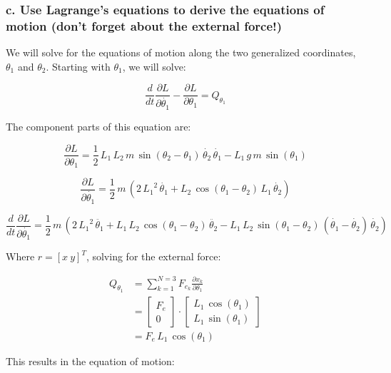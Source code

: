 \documentclass[12pt, letterpaper]{../assignment}
\begin{document}
\subsubsection*{c. Use Lagrange's equations to derive the equations of motion (don't forget about the external
force!)}

We will solve for the equations of motion along the two generalized coordinates, $\theta_1$ and $\theta_2$.
Starting with $\theta_1$, we will solve:

$$ \frac{d}{d t} \frac{\partial L}{\partial \dot{\theta_1}} - \frac{\partial L}{\partial \theta_1} = Q_{\theta_1} $$

The component parts of this equation are:

$$ \frac{\partial L}{\partial \theta_1} = 
\frac{1}{2}\,L_1 \,L_2 \,m\,\sin \left(\theta_2 -\theta_1 \right)\,\dot{\theta_2} \,\dot{\theta_1} -L_1 \,g\,m\,\sin \left(\theta_1 \right) $$

$$ \frac{\partial L}{\partial \dot{\theta_1}}  =
\frac{1}{2}\,m\,{\left(2\,{L_1 }^2 \,\dot{\theta_1} +L_2 \,\cos \left(\theta_1 -\theta_2 \right)\,L_1 \,\dot{\theta_2} \right)} $$

$$ \frac{d}{d t} \frac{\partial L}{\partial \dot{\theta_1}} =
\frac{1}{2}\,m\,{\left(2\,{L_1 }^2 \,\ddot{\theta_1} +L_1 \,L_2 \,\cos \left(\theta_1 -\theta_2 \right)\,\ddot{\theta_2} -L_1 \,L_2 \,\sin \left(\theta_1 -\theta_2 \right)\,{\left(\dot{\theta_1} -\dot{\theta_2} \right)}\,\dot{\theta_2} \right)} $$

Where $r = [ x \ y]^T$, solving for the external force:

\begin{equation*}
    \begin{aligned}
    Q_{\theta_1} &= \sum_{k=1}^{N=3} F_{e_k} \frac{\partial x_k }{\partial {\theta_1}}\\
    &=\left[\begin{array}{c} F_{e}\\ 0 \end{array}\right] \cdot \left[\begin{array}{c} L_{1}\,\cos\left(\theta _{1}\right)\\ L_{1}\,\sin\left(\theta _{1}\right) \end{array}\right]\\
    &= F_e \,L_1 \,\cos \left(\theta_1\right)
    \end{aligned}
\end{equation*}

This results in the equation of motion:
\end{document}

